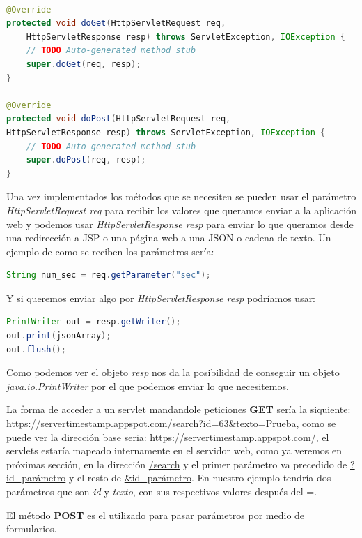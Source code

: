 \begin{lstlisting}[language=Java] 

@Override
protected void doGet(HttpServletRequest req, 
	HttpServletResponse resp) throws ServletException, IOException {
	// TODO Auto-generated method stub
	super.doGet(req, resp);
}

@Override
protected void doPost(HttpServletRequest req, 
HttpServletResponse resp) throws ServletException, IOException {
	// TODO Auto-generated method stub
	super.doPost(req, resp);
}
\end{lstlisting}

Una vez implementados los métodos que se necesiten se pueden usar el parámetro \textit{HttpServletRequest req} para recibir los valores que queramos enviar a la aplicación web y podemos usar \textit{HttpServletResponse resp} para enviar lo que queramos desde una redirección a JSP o una página web a una JSON o cadena de texto. 
Un ejemplo de como se reciben los parámetros sería: 

\begin{lstlisting}[language=Java]  
String num_sec = req.getParameter("sec");
\end{lstlisting}

Y si queremos enviar algo por \textit{HttpServletResponse resp} podríamos usar:

\begin{lstlisting}[language=Java]   
PrintWriter out = resp.getWriter();
out.print(jsonArray);
out.flush();
\end{lstlisting}

Como podemos ver el objeto \textit{resp} nos da la posibilidad de conseguir un objeto \textit{java.io.PrintWriter} por el que podemos enviar lo que necesitemos.

La forma de acceder a un servlet mandandole peticiones \textbf{GET} sería la siquiente: \url{https://servertimestamp.appspot.com/search?id=63&texto=Prueba}, como se puede ver la dirección base seria: \url{https://servertimestamp.appspot.com/}, el servlets estaría mapeado internamente en el servidor web, como ya veremos en próximas sección, en la dirección \url{/search} y el primer parámetro va precedido de \url{?id\_parámetro} y el resto de \url{\&id\_parámetro}. En nuestro ejemplo tendría dos parámetros que son \textit{id} y \textit{texto}, con sus respectivos valores después del =.

El método \textbf{POST} es el utilizado para pasar parámetros por medio de formularios.

